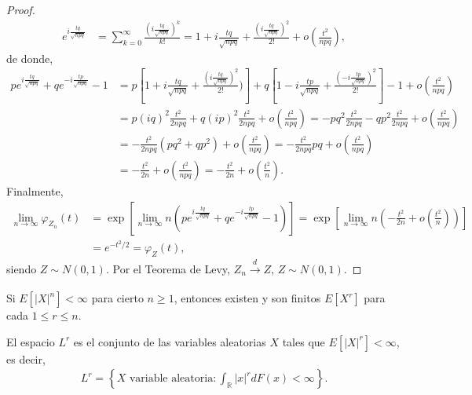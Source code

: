 \begin{obs}
\begin{proof}
    \begin{align*}
        e^{i\frac{tq}{\sqrt{npq}}} &= \sum_{k=0}^{\infty} \frac{\left( i \frac{tq}{\sqrt{npq}} \right)^k}{k!} = 1 + i\frac{tq}{\sqrt{npq}} + \frac{\left( i\frac{tq}{\sqrt{npq}} \right)^2}{2!} + o\left( \frac{t^2}{npq} \right),
    \end{align*}
    de donde,
    \begin{align*}
        pe^{i\frac{tq}{\sqrt{npq}}} + qe^{-i\frac{tp}{\sqrt{npq}}} - 1 &= p\left[ 1 + i\frac{tq}{\sqrt{npq}} + \frac{\left( i\frac{tq}{\sqrt{npq}} \right)^2}{2!}) \right] 
            + q \left[ 1 - i\frac{tp}{\sqrt{npq}} + \frac{\left( -i\frac{tp}{\sqrt{npq}} \right)^2}{2!} \right] -1 + o\left( \frac{t^2}{npq} \right)  \\
            &= p(iq)^2 \frac{t^2}{2npq} + q(ip)^2 \frac{t^2}{2npq} + o\left( \frac{t^2}{npq} \right)
            = -pq^2 \frac{t^2}{2npq} - qp^2 \frac{t^2}{2npq} + o\left( \frac{t^2}{npq} \right) \\
            &= -\frac{t^2}{2npq} \left(pq^2 + qp^2 \right) + o\left( \frac{t^2}{npq} \right) = -\frac{t^2}{2npq} pq + o\left( \frac{t^2}{npq} \right)  \\
            &= -\frac{t^2}{2n} + o\left( \frac{t^2}{npq} \right) = -\frac{t^2}{2n} + o\left( \frac{t^2}{n} \right).
    \end{align*}
    Finalmente, 
    \begin{align*}
        \lim_{n \to \infty} \varphi_{Z_n}(t) &= \exp\left[ \lim_{n \to \infty} n\left(pe^{i\frac{tq}{\sqrt{npq}}} + qe^{-i\frac{tp}{\sqrt{npq}}} - 1 \right) \right] 
    = \exp\left[ \lim_{n \to \infty} n \left( -\frac{t^2}{2n} + o\left( \frac{t^2}{n} \right) \right) \right] \\
    &= e^{-t^2/2} = \varphi_Z(t),
    \end{align*}
    siendo $Z \sim N(0,1)$. Por el Teorema de Levy, $Z_n \xrightarrow[]{d} Z$, $Z \sim N(0,1)$.
\end{proof}
\end{obs}

\begin{prop}
    Si $E[|X|^n] < \infty$ para cierto $n \ge 1$, entonces existen y son finitos $E[X^r]$ para cada $1 \leq r \leq n$.
\end{prop}

\begin{defi}
    El espacio $L^r$ es el conjunto de las variables aleatorias $X$ tales que $E[|X|^r] < \infty$, es decir,
    \begin{align*}
        L^r = \left\{ X \text{ variable aleatoria} : \int_{\mathbb{R}} |x|^r dF(x) < \infty\right\}.
    \end{align*}
\end{defi}

